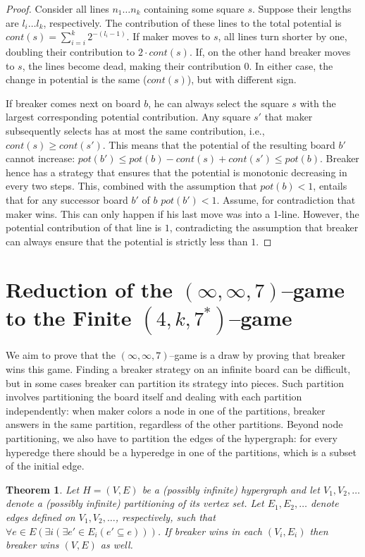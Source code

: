 \documentclass[conference]{IEEEtran}
\newtheorem{theorem}{Theorem}[section]
\theoremstyle{definition}
\begin{document}
\begin{proof}
Consider all lines $n_1 \dots n_k$ containing some square $s$. Suppose their lengths are $l_i \dots l_k$, respectively. The contribution of these lines to the total potential is $cont(s) = \sum_{i=i}^{k} 2^{-(l_i-1)}$. If maker moves to $s$, all lines turn shorter by one, doubling their contribution to $2\cdot cont(s)$. If, on the other hand breaker moves to $s$, the lines become dead, making their contribution $0$. In either case, the change in potential is the same ($cont(s)$), but with different sign. 

If breaker comes next on board $b$, he can always select the square $s$ with the largest corresponding potential contribution. Any square $s'$ that maker subsequently selects has at most the same contribution, i.e., $cont(s) \geq cont(s')$. This means that the potential of the resulting board $b'$ cannot increase: $pot(b') \leq pot(b) - cont(s) + cont(s') \leq pot(b)$. Breaker hence has a strategy that ensures that the potential is monotonic decreasing in every two steps. This, combined with the assumption that $pot(b) < 1$, entails that for any successor board $b'$ of $b$ $pot(b') < 1$. 
Assume, for contradiction that maker wins. This can only happen if his last move was into a 1-line. However, the potential contribution of that line is $1$, contradicting the assumption that breaker can always ensure that the potential is strictly less than $1$.
\end{proof}


\section{Reduction of the $(\infty,\infty,7)$--game to the Finite
  ${(4,k,7^*)}$--game}
\label{sec:reduction}

We aim to prove that the $(\infty,\infty,7)$--game is a draw by proving that breaker wins this game.
Finding a breaker strategy on an infinite board can be difficult, but in some cases breaker can partition its strategy into pieces. Such partition involves partitioning the board itself and dealing with each partition independently: when maker colors a node in one of the partitions, breaker answers in the same partition, regardless of the other partitions.
Beyond node partitioning, we also have to partition the edges of the hypergraph: for every hyperedge there should be a hyperedge in one of the partitions, which is a subset of the initial edge. 

\begin{theorem}
\label{thm:reduction}
Let $H = (V, E)$ be a (possibly infinite) hypergraph and let $V_1, V_2, \dots$ denote a (possibly infinite) partitioning of its vertex set. Let $E_1, E_2, \dots$ denote edges defined on $V_1, V_2, \dots$, respectively, such that $\forall e \in E (\exists i (\exists e' \in E_i (e' \subseteq e)))$. If breaker wins in each $(V_i, E_i)$ then breaker wins $(V, E)$ as well.
\end{theorem}
\end{document}
